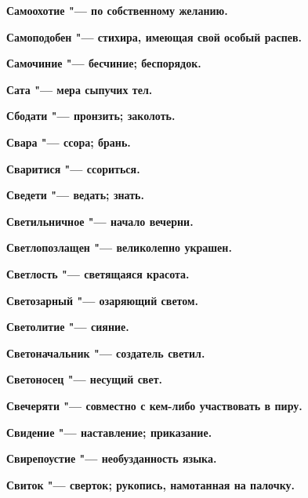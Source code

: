 \begin{mymulticols}{2}
\bfseries Самоохотие\normalfont{} "--- по собственному желанию. 




\bfseries Самоподобен\normalfont{} "--- стихира, имеющая свой особый распев. 




\bfseries Самочиние\normalfont{} "--- бесчиние; беспорядок. 




\bfseries Сата\normalfont{} "--- мера сыпучих тел. 




\bfseries Сбодати\normalfont{} "--- пронзить; заколоть. 




\bfseries Свара\normalfont{} "--- ссора; брань. 




\bfseries Сваритися\normalfont{} "--- ссориться. 




\bfseries Сведети\normalfont{} "--- ведать; знать. 




\bfseries Светильничное\normalfont{} "--- начало вечерни. 




\bfseries Светлопозлащен\normalfont{} "--- великолепно украшен. 




\bfseries Светлость\normalfont{} "--- светящаяся красота. 




\bfseries Светозарный\normalfont{} "--- озаряющий светом. 




\bfseries Светолитие\normalfont{} "--- сияние. 




\bfseries Светоначальник\normalfont{} "--- создатель светил. 




\bfseries Светоносец\normalfont{} "--- несущий свет. 




\bfseries Свечеряти\normalfont{} "--- совместно с кем-либо участвовать в пиру. 




\bfseries Свидение\normalfont{} "--- наставление; приказание. 




\bfseries Свирепоустие\normalfont{} "--- необузданность языка. 




\bfseries Свиток\normalfont{} "--- сверток; рукопись, намотанная на палочку. 





\end{mymulticols}
